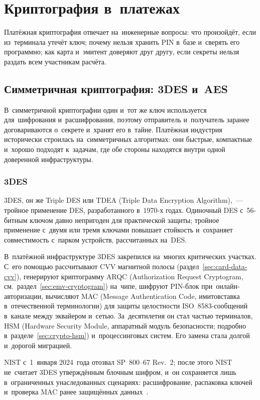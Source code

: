 
\chapter{Криптография в~платежах}\label{ch:crypto}
Платёжная криптография отвечает на~инженерные вопросы: что произойдёт, если
из~терминала утечёт ключ; почему нельзя хранить PIN в~базе и~сверять его
программно; как карта и~эмитент доверяют друг другу, если секреты нельзя
раздать всем участникам расчёта.

\FloatBarrier
\section{Симметричная криптография: 3DES и~AES}\label{sec:crypto-symmetric}

В~симметричной криптографии один и~тот же ключ используется для~шифрования
и~расшифрования, поэтому отправитель и~получатель заранее договариваются
о~секрете и~хранят его в~тайне. Платёжная индустрия исторически строилась
на~симметричных алгоритмах: они быстрые, компактные и~хорошо подходят
к~задачам, где обе стороны находятся внутри одной доверенной
инфраструктуры.

\subsection*{3DES}

3DES, он же Triple DES или TDEA (Triple Data Encryption Algorithm),~--- тройное
применение DES, разработанного в~1970-х годах. Одиночный DES с~56-битным ключом
давно непригоден для практической защиты; тройное применение с~двумя или тремя
ключами повышает стойкость и~сохраняет совместимость с~парком
устройств, рассчитанных на~DES.

В~платёжной инфраструктуре 3DES закрепился на~многих критических участках.
С~его помощью рассчитывают CVV магнитной полосы (раздел~\ref{sec:card-data-cvv}),
генерируют криптограмму ARQC
(Authorization Request Cryptogram, см.~раздел~\ref{sec:emv-cryptogram})
на~чипе, шифруют PIN-блок при~онлайн-авторизации, вычисляют MAC (Message
Authentication Code, имитовставка в~отечественной терминологии) для защиты
целостности ISO~8583-сообщений в~канале между эквайером и~сетью. За~десятилетия
он стал частью терминалов, HSM (Hardware Security Module, аппаратный модуль
безопасности; подробно в~разделе~\ref{sec:crypto-hsm}) и~процессинговых
систем. Его замена стала долгой и~дорогой миграцией.

NIST с~1~января 2024~года отозвал SP~800--67 Rev.~2; после этого NIST не~считает 3DES
утверждённым блочным шифром, и~он сохраняется лишь в~ограниченных
унаследованных сценариях: расшифрование, распаковка ключей и~проверка MAC
ранее защищённых данных~\cite{nist-sp800-67r2,nist-sp800-67-withdrawal}.

